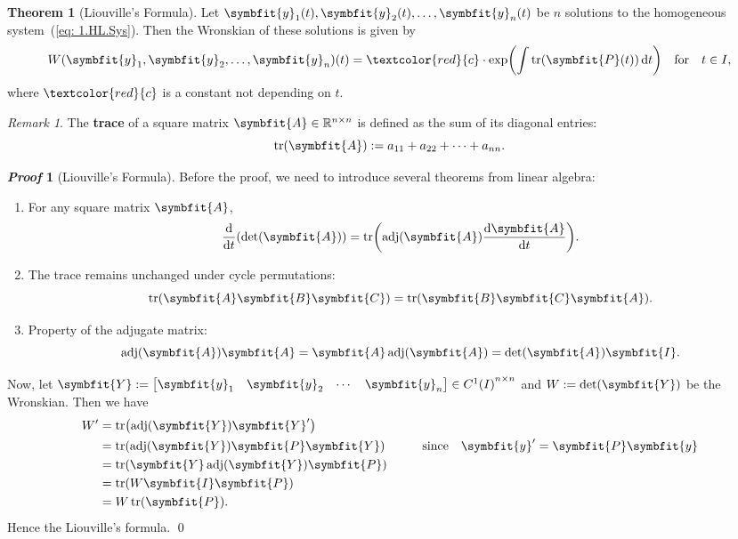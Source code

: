 \documentclass[10pt,UTF8]{article}
\newcommand{\mat}[1]{\symbfit{#1}}
\renewcommand{\vec}[1]{%
  \ifnum0\ifcat#1a1\else0\fi>0
  \symbfit{#1}  %
  \else
  \symbf{#1}  %
  \fi
}
\newenvironment{theoremBox}
{ \bigskip
  \begin{tcolorbox}[colback=yellow!5!white,colframe=yellow!75!black,parbox=false,before
  upper=\par,before lower=\par]}
  {
\end{tcolorbox}}
\theoremstyle{definition}
\newtheorem{definition inner}{Definition}[section]
\theoremstyle{definition}
\newtheorem{theorem inner}{Theorem}[section]
\newenvironment{theorem}[1][]
{
  \begin{theoremBox}
  \begin{theorem inner}[#1]\hfill\par}
    {
    \end{theorem inner}
\end{theoremBox}}
\theoremstyle{definition}
\newtheorem*{proof inner}{\textit{Proof}}
\renewenvironment{proof}[1][]
{
\begin{proof inner}[#1]\hfill\par}
  {\qed\vphantom{.}
\end{proof inner}}
\theoremstyle{plain}
\newtheorem{tip inner}{Tip}[section]
\theoremstyle{remark}
\newtheorem*{remark}{\textit{Remark}}
\DeclareMathOperator{\adj}{adj}  %
\begin{document}
\begin{theorem}[Liouville's Formula]
  {}\label{thm: Liouville's Formula}
  Let \(\vec{y}_1(t), \vec{y}_2(t), \ldots,
  \vec{y}_n(t)\) be \(n\) solutions
  to the homogeneous system~(\ref{eq: 1.HL.Sys}).
  Then the Wronskian of these solutions is given by
  \begin{equation*}
    W(\vec{y}_1, \vec{y}_2, \ldots, \vec{y}_n)(t) =
    \textcolor{red}{c} \cdot
    \exp( \int \tr(\mat{P}(t)) \dd{t} )
    \qfor t\in I,
  \end{equation*}
  where \(\textcolor{red}{c}\) is a constant
  not depending on \(t\).
\end{theorem}
\begin{remark}
  The \textbf{trace} of a square matrix
  \(\mat{A} \in \mathbb{R}^{n \times n}\)
  is defined as the sum of its diagonal entries:
  \begin{equation*}
    \tr(\mat{A}) := a_{11} + a_{22} + \cdots + a_{nn}.
  \end{equation*}
\end{remark}
\begin{proof}[Liouville's Formula]
  Before the proof, we need to introduce several theorems from linear algebra:
  \begin{enumerate}
    \item For any square matrix \(\mat{A}\),
      \begin{equation}
        \dv{t}(\det(\mat{A})) = \tr(\adj(\mat{A}) \dv{\mat{A}}{t}).
        \label{thm: local.01 dv of det}
      \end{equation}
    \item The trace remains unchanged under cycle permutations:
      \begin{equation}
        \tr(\mat{A}\mat{B}\mat{C}) = \tr(\mat{B}\mat{C}\mat{A}).
        \label{thm: local.02 trace cycle perm}
      \end{equation}
    \item Property of the adjugate matrix:
      \begin{equation}
        \adj(\mat{A}) \mat{A} = \mat{A} \adj(\mat{A})
        = \det(\mat{A}) \mat{I}.
        \label{thm: local.03 adj property}
      \end{equation}
  \end{enumerate}

  Now, let \(\mat{Y} :=
    \begin{bmatrix}
      \vec{y}_1 & \vec{y}_2 & \cdots & \vec{y}_n
  \end{bmatrix} \in {C^1(I)}^{n \times n}\)
  and \(W := \det(\mat{Y})\) be the Wronskian.
  Then we have
  \begin{align*}
    W' &= \tr(\adj(\mat{Y}) \mat{Y}') \\
    &= \tr(\adj(\mat{Y}) \mat{P} \mat{Y})
    \qquad\qsince \vec{y}' = \mat{P} \vec{y} \\
    &= \tr(\mat{Y} \adj(\mat{Y}) \mat{P}) \\
    &= \tr(W \mat{I} \mat{P}) \\
    &= W \tr(\mat{P}).
  \end{align*}
  Hence the Liouville's formula.
\end{proof}
\end{document}
